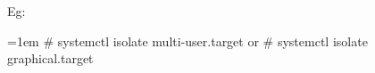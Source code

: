 \begin{flushleft}
\begin{itemize}
\begin{itemize}
		Eg:
		\begin{tcolorbox}[breakable,notitle,boxrule=-0pt,colback=black,colframe=black]
			\color{green}
			\font=1em
			\# systemctl isolate multi-user.target
			\newline
			or
			\newline
			\# systemctl isolate graphical.target
			\font=4pt
		\end{tcolorbox}
												
	\end{itemize}

\end{itemize}
	
\end{flushleft}
\newpage


